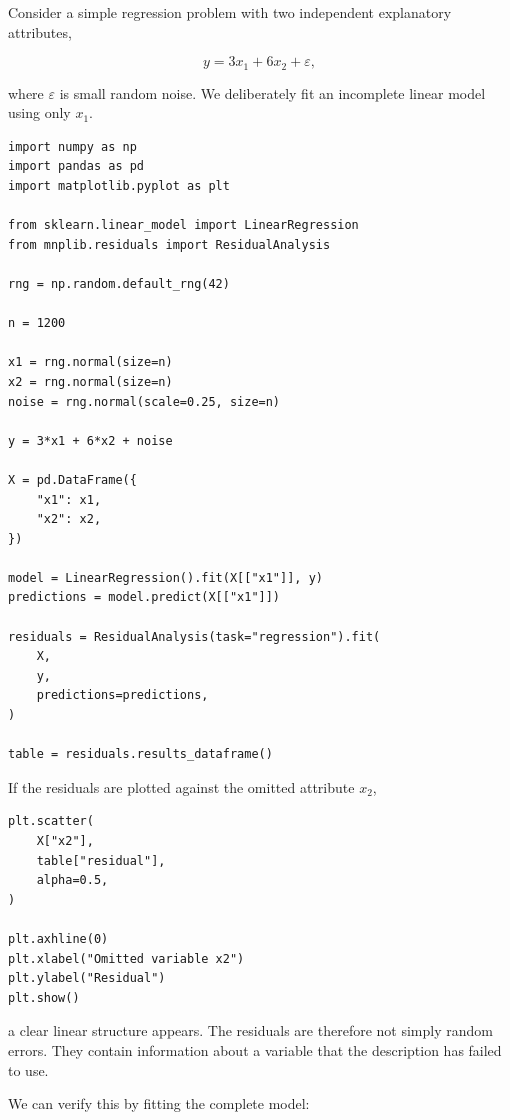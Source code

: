 \begin{example}
\label{ex:residual_missing_variable}

Consider a simple regression problem with two independent explanatory
attributes,

\[
y=3x_1+6x_2+\varepsilon,
\]

where \(\varepsilon\) is small random noise. We deliberately fit an incomplete
linear model using only \(x_1\).

\begin{sourcecode}
{\scriptsize
\begin{verbatim}
import numpy as np
import pandas as pd
import matplotlib.pyplot as plt

from sklearn.linear_model import LinearRegression
from mnplib.residuals import ResidualAnalysis

rng = np.random.default_rng(42)

n = 1200

x1 = rng.normal(size=n)
x2 = rng.normal(size=n)
noise = rng.normal(scale=0.25, size=n)

y = 3*x1 + 6*x2 + noise

X = pd.DataFrame({
    "x1": x1,
    "x2": x2,
})

model = LinearRegression().fit(X[["x1"]], y)
predictions = model.predict(X[["x1"]])

residuals = ResidualAnalysis(task="regression").fit(
    X,
    y,
    predictions=predictions,
)

table = residuals.results_dataframe()
\end{verbatim}}
\end{sourcecode}

If the residuals are plotted against the omitted attribute \(x_2\),

\begin{sourcecode}
{\scriptsize
\begin{verbatim}
plt.scatter(
    X["x2"],
    table["residual"],
    alpha=0.5,
)

plt.axhline(0)
plt.xlabel("Omitted variable x2")
plt.ylabel("Residual")
plt.show()
\end{verbatim}}
\end{sourcecode}

a clear linear structure appears. The residuals are therefore not simply random
errors. They contain information about a variable that the description has
failed to use.

We can verify this by fitting the complete model:


\end{example}
